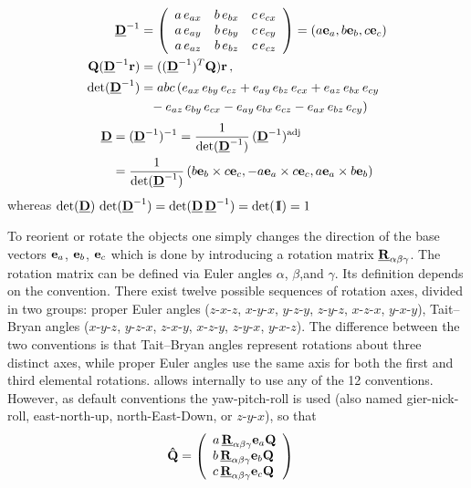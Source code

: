 \begin{align}
\M{D}^{-1} &=
\left(
\begin{array}{ccc}
a\, e_{ax} & b\, e_{bx} & c\, e_{cx} \\
a\, e_{ay} & b\, e_{by} & c\, e_{cy} \\
a\, e_{az} & b\, e_{bz} & c\, e_{cz} \\
\end{array}
\right) = (a\B{e}_a,b\B{e}_b,c\B{e}_c)\\
 \B{Q}(\M{D}^{-1}\B{r}) &= ((\M{D}^{-1})^T\B{Q})\B{r} \U{,}\\
\det(\M{D}^{-1}) &= abc\,
( e_{ax}\, e_{by}\, e_{cz}
+ e_{ay}\, e_{bz}\, e_{cx}
+ e_{az}\, e_{bx}\, e_{cy} \nonumber \\
&\phantom{=} - e_{az}\, e_{by}\, e_{cx}
   - e_{ay}\, e_{bx}\, e_{cz}
   - e_{ax}\, e_{bz}\, e_{cy})
\end{align}
\begin{align}
\M{D} &= (\M{D}^{-1})^{-1} = \frac{1}{\det(\M{D}^{-1})}\,
          (\M{D}^{-1})^{\rm adj} \nonumber \\
&= \frac{1}{\det(\M{D}^{-1})} \, (b\B{e}_b\times c\B{e}_c,-a\B{e}_a
\times c\B{e}_c,a\B{e}_a\times b\B{e}_b)
\end{align}
whereas $\det(\M{D}) \, \det(\M{D}^{-1}) = \det(\M{D}\, \M{D}^{-1}) =\det(\idty) = 1$

To reorient or rotate the objects one simply changes the  direction of the base vectors $\B{e}_a$, $\B{e}_b$, $\B{e}_c$ which is done by introducing a rotation matrix $\M{R}_{\alpha\beta\gamma}$. The rotation matrix can be defined via Euler angles $\alpha$, $\beta$,and $\gamma$. Its definition depends on the convention. There exist twelve possible sequences of rotation axes, divided in two groups: proper Euler angles ($z$-$x$-$z$, $x$-$y$-$x$, $y$-$z$-$y$, $z$-$y$-$z$, $x$-$z$-$x$, $y$-$x$-$y$),
Tait–Bryan angles ($x$-$y$-$z$, $y$-$z$-$x$, $z$-$x$-$y$, $x$-$z$-$y$, $z$-$y$-$x$, $y$-$x$-$z$). The difference between the two conventions is that Tait–Bryan angles represent rotations about three distinct axes, while proper Euler angles use the same axis for both the first and third elemental rotations. \SASfit allows internally to use any of the 12 conventions. However, as default conventions the yaw-pitch-roll is used (also named gier-nick-roll, east-north-up, north-East-Down, or $z$-$y$-$x$),  so that
\begin{align}
\displaystyle \B{\hat{Q}} &=
  \left( \begin{array}{l} a\,\M{R}_{\alpha\beta\gamma}\B{e}_a\B{Q}\\
                          b\,\M{R}_{\alpha\beta\gamma}\B{e}_b\B{Q}\\
                          c\,\M{R}_{\alpha\beta\gamma}\B{e}_c\B{Q}
\end{array}\right)
\label{eq:Q:dach}
\end{align}
\vspace{5mm}

